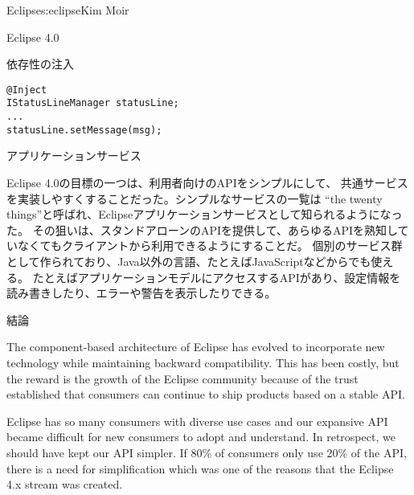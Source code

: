 \begin{aosachapter}{Eclipse}{s:eclipse}{Kim Moir}
\begin{aosasect1}{Eclipse 4.0}
\begin{aosasect2}{依存性の注入}
\begin{verbatim}
@Inject
IStatusLineManager statusLine;
...
statusLine.setMessage(msg);
\end{verbatim}

\end{aosasect2}

\begin{aosasect2}{アプリケーションサービス}

Eclipse 4.0の目標の一つは、利用者向けのAPIをシンプルにして、
共通サービスを実装しやすくすることだった。シンプルなサービスの一覧は
``the twenty things''と呼ばれ、Eclipseアプリケーションサービスとして知られるようになった。
その狙いは、スタンドアローンのAPIを提供して、あらゆるAPIを熟知していなくてもクライアントから利用できるようにすることだ。
個別のサービス群として作られており、Java以外の言語、たとえばJavaScriptなどからでも使える。
たとえばアプリケーションモデルにアクセスするAPIがあり、設定情報を読み書きしたり、エラーや警告を表示したりできる。

\end{aosasect2}

\end{aosasect1}

\begin{aosasect1}{結論}

The component-based architecture of Eclipse has evolved to incorporate
new technology while maintaining backward compatibility.  This has
been costly, but the reward is the growth of the Eclipse community
because of the trust established that consumers can continue to ship
products based on a stable API.

Eclipse has so many consumers with diverse use cases and our expansive
API became difficult for new consumers to adopt and understand. In
retrospect, we should have kept our API simpler. If 80\% of consumers
only use 20\% of the API, there is a need for simplification which was
one of the reasons that the Eclipse 4.x stream was created.


\end{aosasect1}
\end{aosachapter}
